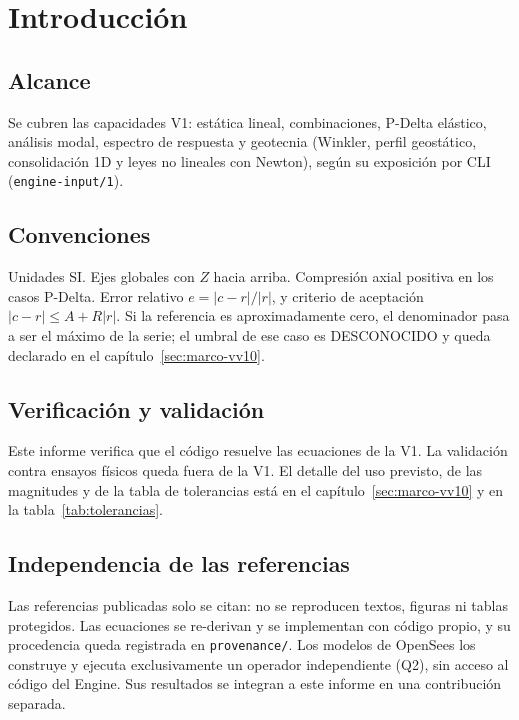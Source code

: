 \chapter{Introducción}
\section{Alcance}
Se cubren las capacidades V1: estática lineal, combinaciones, P-Delta elástico, análisis modal, espectro de respuesta y geotecnia (Winkler, perfil geostático, consolidación 1D y leyes no lineales con Newton), según su exposición por CLI (\texttt{engine-input/1}).
\section{Convenciones}
Unidades SI. Ejes globales con $Z$ hacia arriba. Compresión axial positiva en los casos P-Delta. Error relativo $e=|c-r|/|r|$, y criterio de aceptación $|c-r|\le A+R|r|$. Si la referencia es aproximadamente cero, el denominador pasa a ser el máximo de la serie; el umbral de ese caso es DESCONOCIDO y queda declarado en el capítulo~\ref{sec:marco-vv10}.
\section{Verificación y validación}
Este informe verifica que el código resuelve las ecuaciones de la V1. La validación contra ensayos físicos queda fuera de la V1. El detalle del uso previsto, de las magnitudes y de la tabla de tolerancias está en el capítulo~\ref{sec:marco-vv10} y en la tabla~\ref{tab:tolerancias}.
\section{Independencia de las referencias}
Las referencias publicadas solo se citan: no se reproducen textos, figuras ni tablas protegidos. Las ecuaciones se re-derivan y se implementan con código propio, y su procedencia queda registrada en \texttt{provenance/}. Los modelos de OpenSees los construye y ejecuta exclusivamente un operador independiente (Q2), sin acceso al código del Engine. Sus resultados se integran a este informe en una contribución separada.

